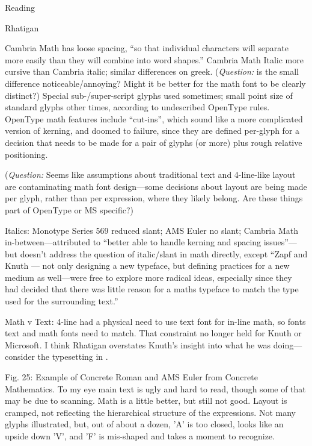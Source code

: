\documentclass[11pt]{PalisadesLakesBook}
\begin{document}
\begin{plSection}{Reading}
\begin{plSection}{Rhatigan}
\begin{plSection}{}
\begin{plSection}{}
Cambria Math has loose spacing, 
``so that individual characters will separate more easily 
than they will combine into word shapes.''
Cambria Math Italic more cursive than Cambria italic;
similar differences on greek.
(\emph{Question:} is the small difference noticeable/annoying?
Might it be better for the math font to be clearly distinct?)
Special sub-/super-script glyphs used sometimes; small point size
of standard glyphs other times, according to 
undescribed OpenType rules.
OpenType math features include ``cut-ins'', which sound like
a more complicated version of kerning, and doomed to failure,
since they are defined per-glyph for a decision that needs to be
made for a pair of glyphs (or more) plus rough relative
positioning.

(\emph{Question:} Seems like assumptions about traditional text and 
4-line-like
layout are contaminating math font design---some decisions about
layout are being made per glyph, rather than per expression,
where they likely belong. Are these things part of OpenType
or MS specific?) 

 
\end{plSection}%
\begin{plSection}{}

Italics: Monotype Series 569 reduced slant; AMS Euler no slant;
Cambria Math in-between---attributed to 
``better able to handle kerning and spacing issues''---but doesn't
address the question of italic/slant in math directly, except
``Zapf and Knuth — not only designing a new typeface, 
but defining practices for a new medium as well---were 
free to explore more radical ideas, 
especially since they had decided that there was little reason 
for a maths typeface to match the type used 
for the surrounding text.''

Math v Text: 
4-line had a physical need to use text font for in-line math, 
so fonts text and math fonts need to match.
That constraint no longer held for Knuth or Microsoft.
I think Rhatigan overstates Knuth's insight into what he was
doing---consider the typesetting in 
.

Fig. 25: Example of Concrete Roman and AMS Euler 
from Concrete Mathematics. 
To my eye main text is ugly and hard to
read, though some of that may be due to scanning.
Math is a little better, but still not good.
Layout is cramped, not reflecting the hierarchical structure
of the expressions.
Not many glyphs illustrated, but, out of about a dozen,
'A' is too closed, looks like an upside down 'V',
and 'F' is mis-shaped and takes a moment to recognize.


\end{plSection}
\end{plSection}
\end{plSection}
\end{plSection}
\end{document}
